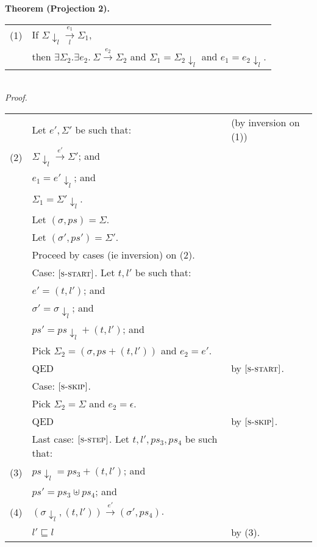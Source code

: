 \documentclass{article}
\newcommand{\rn}[1]{\text{\textsc{[#1]}}}
\newcommand{\tsteparrow}[1]{\overset{#1}{\longrightarrow}}
\newcommand{\tstep}[3]{#2\tsteparrow{#1}#3}
\newcommand{\ssteparrow}[1]{\overset{#1}{\longrightarrow}}
\newcommand{\sstep}[3]{#2\ssteparrow{#1}#3}
\newcommand{\lssteparrow}[2]{\overset{#2}{\underset{#1}{\longrightarrow}}}
\newcommand{\lsstep}[4]{#3\lssteparrow{#1}{#2}#4}
\newcommand{\process}[2]{(#1,#2)}
\newcommand{\proj}[2]{#1{\downarrow_{#2}}}
\begin{document}
\newpage
\noindent
%
%
\textbf{Theorem (Projection 2).}
\\
\begin{tabular}{l@{$\qquad$}l}
  (1) & If $\lsstep{l}{e_1}{\proj{\Sigma}{l}}{\Sigma_1}$,
\\
      & then $\exists \Sigma_2.\exists e_2.~\sstep{e_2}{\Sigma}{\Sigma_2}$
        and $\Sigma_1 = \proj{\Sigma_2}{l}$
        and $e_1 = \proj{e_2}{l}$.
\end{tabular}
\\
\textit{Proof.}
\\
\begin{tabular}{l@{$\qquad$}l@{\qquad}l}
        & Let $e',\Sigma'$ be such that:
        & (by inversion on (1))
\\
  (2)   & $\sstep{e'}{\proj{\Sigma}{l}}{\Sigma'}$; and
\\
        & $e_1=\proj{e'}{l}$; and
\\
        & $\Sigma_1=\proj{\Sigma'}{l}$.
\\
        & Let $(\sigma,ps)=\Sigma$.
\\
        & Let $(\sigma',ps')=\Sigma'$.
\\
        & Proceed by cases (ie inversion) on (2).
\\
        & Case: $\rn{s-start}$. Let $t,l'$ be such that:
\\
        & \z $e'=\process{t}{l'}$; and
\\
        & \z $\sigma'=\proj{\sigma}{l}$; and
\\
        & \z $ps'=\proj{ps}{l}+\process{t}{l'}$; and
\\
        & \z Pick $\Sigma_2 = (\sigma,ps+\process{t}{l'})$ and $e_2=e'$.
\\
        & \z QED
        & by $\rn{s-start}$.
\\
        & Case: $\rn{s-skip}$.
\\
        & \z Pick $\Sigma_2=\Sigma$ and $e_2=\epsilon$.
\\
        & \z QED
        & by $\rn{s-skip}$.
\\
        & Last case: $\rn{s-step}$. Let $t,l',ps_3,ps_4$ be such that:
\\
  (3)   & $\proj{ps}{l}=ps_3+\process{t}{l'}$; and
\\
        & $ps'=ps_3\uplus ps_4$; and
\\
  (4)   & $\tstep{e'}{(\proj{\sigma}{l},\process{t}{l'})}{(\sigma',ps_4)}$.
\\
        & $l'\sqsubseteq l$
        & by (3).
\\

\end{tabular}
\end{document}
